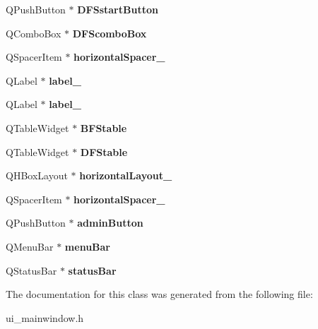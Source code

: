 \begin{DoxyCompactItemize}
Q\+Push\+Button $\ast$ {\bfseries D\+F\+Sstart\+Button}
\item 
\mbox{\label{class_ui___main_window_a98941b1be95cfda7e0245a8a1e084001}} 
Q\+Combo\+Box $\ast$ {\bfseries D\+F\+Scombo\+Box}
\item 
\mbox{\label{class_ui___main_window_a4fc05b11984637298795a354792c4023}} 
Q\+Spacer\+Item $\ast$ {\bfseries horizontal\+Spacer\+\_}
\item 
\mbox{\label{class_ui___main_window_a78c7e10730b43c6700cd7216911ed76a}} 
Q\+Label $\ast$ {\bfseries label\+\_}
\item 
\mbox{\label{class_ui___main_window_ad6bab8fb8903b8f41afea1218ee52695}} 
Q\+Label $\ast$ {\bfseries label\+\_}
\item 
\mbox{\label{class_ui___main_window_a25bfeb989e7757783b83516b94fc9003}} 
Q\+Table\+Widget $\ast$ {\bfseries B\+F\+Stable}
\item 
\mbox{\label{class_ui___main_window_ab712a9480a2f4ca6ae27685f45240876}} 
Q\+Table\+Widget $\ast$ {\bfseries D\+F\+Stable}
\item 
\mbox{\label{class_ui___main_window_a80867018070156432923d0266cc9fe25}} 
Q\+H\+Box\+Layout $\ast$ {\bfseries horizontal\+Layout\+\_}
\item 
\mbox{\label{class_ui___main_window_a100e0ffd031f76754eba5078288deabf}} 
Q\+Spacer\+Item $\ast$ {\bfseries horizontal\+Spacer\+\_}
\item 
\mbox{\label{class_ui___main_window_a925ce7e6309f6d33ffea69ca078aa72b}} 
Q\+Push\+Button $\ast$ {\bfseries admin\+Button}
\item 
\mbox{\label{class_ui___main_window_a2be1c24ec9adfca18e1dcc951931457f}} 
Q\+Menu\+Bar $\ast$ {\bfseries menu\+Bar}
\item 
\mbox{\label{class_ui___main_window_a50fa481337604bcc8bf68de18ab16ecd}} 
Q\+Status\+Bar $\ast$ {\bfseries status\+Bar}
\end{DoxyCompactItemize}


The documentation for this class was generated from the following file\+:\begin{DoxyCompactItemize}
\item 
ui\+\_\+mainwindow.\+h\end{DoxyCompactItemize}
